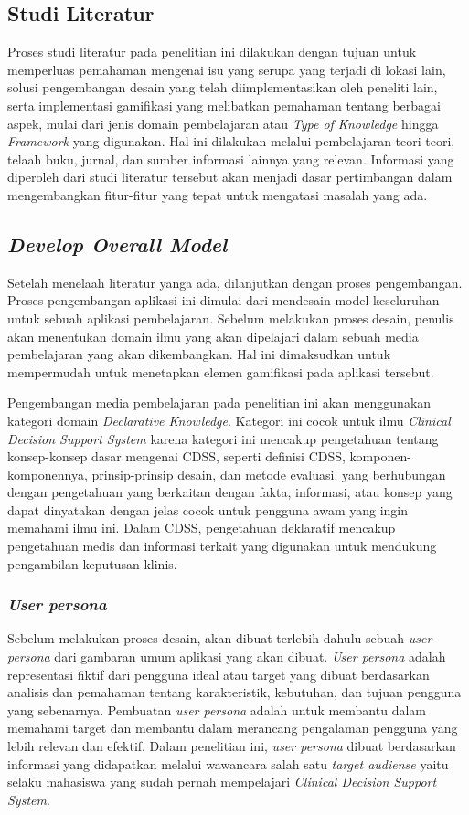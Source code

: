\subsection{Studi Literatur}
Proses studi literatur pada penelitian ini dilakukan dengan tujuan untuk memperluas pemahaman mengenai isu yang serupa yang terjadi di lokasi lain, 
solusi pengembangan desain yang telah diimplementasikan oleh peneliti lain, serta implementasi gamifikasi yang melibatkan pemahaman tentang berbagai aspek, 
mulai dari jenis domain pembelajaran atau \textit{Type of Knowledge} hingga \textit{Framework} yang digunakan. 
Hal ini dilakukan melalui pembelajaran teori-teori, telaah buku, jurnal, dan sumber informasi lainnya yang relevan. 
Informasi yang diperoleh dari studi literatur tersebut akan menjadi dasar pertimbangan dalam mengembangkan fitur-fitur yang tepat untuk mengatasi masalah yang ada.
\subsection{\textit{Develop Overall Model}}
Setelah menelaah literatur yanga ada, dilanjutkan dengan proses pengembangan. Proses pengembangan aplikasi ini dimulai dari mendesain model keseluruhan untuk sebuah aplikasi pembelajaran.
Sebelum melakukan proses desain, penulis akan menentukan domain ilmu yang akan dipelajari dalam sebuah media pembelajaran yang akan dikembangkan. Hal ini dimaksudkan untuk mempermudah untuk menetapkan elemen gamifikasi pada aplikasi tersebut.

Pengembangan media pembelajaran pada penelitian ini akan menggunakan kategori domain \textit{Declarative Knowledge}. Kategori ini cocok untuk ilmu \textit{Clinical Decision Support System} karena kategori ini mencakup pengetahuan tentang konsep-konsep dasar mengenai CDSS, seperti definisi CDSS, komponen-komponennya, prinsip-prinsip desain, dan metode evaluasi.
yang berhubungan dengan pengetahuan yang berkaitan dengan fakta, informasi, atau konsep yang dapat dinyatakan dengan jelas cocok untuk pengguna awam yang ingin memahami ilmu ini. Dalam CDSS, pengetahuan deklaratif mencakup pengetahuan medis dan informasi terkait yang digunakan untuk mendukung pengambilan keputusan klinis.

\subsubsection{\textit{User persona}}
Sebelum melakukan proses desain, akan dibuat terlebih dahulu sebuah \textit{user persona} dari gambaran umum aplikasi yang akan dibuat.
\textit{User persona} adalah representasi fiktif dari pengguna ideal atau target yang dibuat berdasarkan analisis dan pemahaman tentang karakteristik, kebutuhan, dan tujuan pengguna yang sebenarnya. 
Pembuatan \textit{user persona} adalah untuk membantu dalam memahami target dan membantu dalam merancang pengalaman pengguna yang lebih relevan dan efektif.
Dalam penelitian ini, \textit{user persona} dibuat berdasarkan informasi yang didapatkan melalui wawancara salah satu \textit{target audiense} yaitu selaku mahasiswa yang sudah pernah mempelajari \textit{Clinical Decision Support System}.

